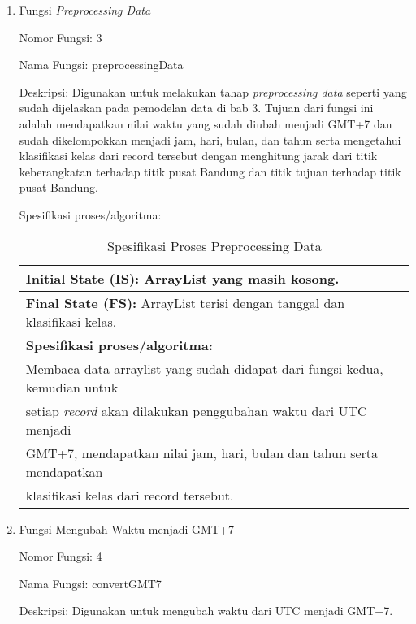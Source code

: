 \begin{enumerate}
	
	\item Fungsi \textsl{Preprocessing Data}
	
	Nomor Fungsi: 3
	
	Nama Fungsi: preprocessingData
	
	Deskripsi: Digunakan untuk melakukan tahap \textsl{preprocessing data} seperti yang sudah dijelaskan pada pemodelan data di bab 3. Tujuan dari fungsi ini adalah mendapatkan nilai waktu yang sudah diubah menjadi GMT+7 dan sudah dikelompokkan menjadi jam, hari, bulan, dan tahun serta mengetahui klasifikasi kelas dari record tersebut dengan menghitung jarak dari titik keberangkatan terhadap titik pusat Bandung dan titik tujuan terhadap titik pusat Bandung.
	
	Spesifikasi proses/algoritma:
	\begin{table}[h]
	\caption{Spesifikasi Proses Preprocessing Data}
	\label{table:spesifikasiPreprocessingData}
	\centering
	\begin{tabular}{|l|}
	\hline
	\textbf{Initial State (IS): }ArrayList yang masih kosong.		 																			\\ \hline
	\textbf{Final State (FS): }ArrayList terisi dengan tanggal dan klasifikasi kelas. 								\\ \hline
	\textbf{Spesifikasi proses/algoritma:}																 \\
	Membaca data arraylist yang sudah didapat dari fungsi kedua, kemudian untuk		\\
	setiap \textsl{record} akan dilakukan penggubahan waktu dari UTC menjadi 			\\
	GMT+7, mendapatkan nilai jam, hari, bulan dan tahun serta mendapatkan 				\\
	klasifikasi kelas dari record tersebut.\\ \hline	
	\end{tabular}
	\end{table}
	
	
	\item Fungsi Mengubah Waktu menjadi GMT+7
	
	Nomor Fungsi: 4
	
	Nama Fungsi: convertGMT7
	
	Deskripsi: Digunakan untuk mengubah waktu dari UTC menjadi GMT+7.
	

\end{enumerate}
